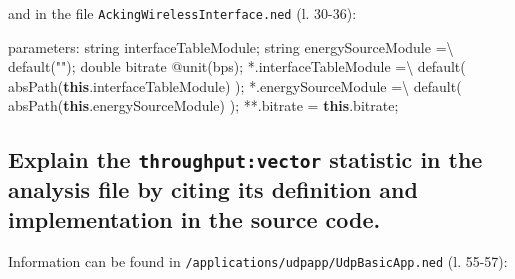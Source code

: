 \documentclass[
  letterpaper,
  DIV=11,
  numbers=noendperiod]{scrartcl}
\newenvironment{Shaded}{\begin{snugshade}}{\end{snugshade}}
\newcommand{\AttributeTok}[1]{\textcolor[rgb]{0.40,0.45,0.13}{#1}}
\newcommand{\FunctionTok}[1]{\textcolor[rgb]{0.28,0.35,0.67}{#1}}
\newcommand{\ImportTok}[1]{\textcolor[rgb]{0.00,0.46,0.62}{#1}}
\newcommand{\KeywordTok}[1]{\textcolor[rgb]{0.00,0.23,0.31}{\textbf{#1}}}
\newcommand{\NormalTok}[1]{\textcolor[rgb]{0.00,0.23,0.31}{#1}}
\newcommand{\OperatorTok}[1]{\textcolor[rgb]{0.37,0.37,0.37}{#1}}
\newcommand{\StringTok}[1]{\textcolor[rgb]{0.13,0.47,0.30}{#1}}
\begin{document}
and in the file \texttt{AckingWirelessInterface.ned} (l. 30-36):

\begin{Shaded}
\begin{Highlighting}[]
\NormalTok{parameters}\OperatorTok{:}
\NormalTok{  string interfaceTableModule}\OperatorTok{;}
\NormalTok{  string energySourceModule }\OperatorTok{=}\NormalTok{\textbackslash{}}
    \ImportTok{default}\NormalTok{(}\StringTok{""}\NormalTok{)}\OperatorTok{;}
\NormalTok{  double bitrate @}\FunctionTok{unit}\NormalTok{(bps)}\OperatorTok{;}
  \OperatorTok{*.}\AttributeTok{interfaceTableModule} \OperatorTok{=}\NormalTok{\textbackslash{}}
    \ImportTok{default}\NormalTok{(}
      \FunctionTok{absPath}\NormalTok{(}\KeywordTok{this}\OperatorTok{.}\AttributeTok{interfaceTableModule}\NormalTok{)}
\NormalTok{    )}\OperatorTok{;}
  \OperatorTok{*.}\AttributeTok{energySourceModule} \OperatorTok{=}\NormalTok{\textbackslash{}}
    \ImportTok{default}\NormalTok{(}
      \FunctionTok{absPath}\NormalTok{(}\KeywordTok{this}\OperatorTok{.}\AttributeTok{energySourceModule}\NormalTok{)}
\NormalTok{    )}\OperatorTok{;}
  \OperatorTok{**.}\AttributeTok{bitrate} \OperatorTok{=} \KeywordTok{this}\OperatorTok{.}\AttributeTok{bitrate}\OperatorTok{;}
\end{Highlighting}
\end{Shaded}

\subsection{\texorpdfstring{Explain the \texttt{throughput:vector}
statistic in the analysis file by citing its definition and
implementation in the source
code.}{Explain the throughput:vector statistic in the analysis file by citing its definition and implementation in the source code.}}\label{explain-the-throughputvector-statistic-in-the-analysis-file-by-citing-its-definition-and-implementation-in-the-source-code.}

Information can be found in
\texttt{/applications/udpapp/UdpBasicApp.ned} (l. 55-57):
\end{document}
